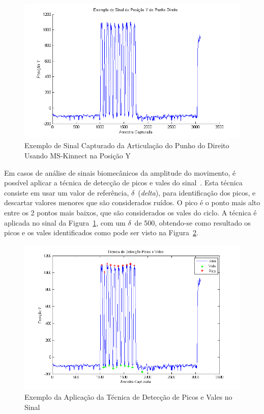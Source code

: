 \begin{figure}[!htb]
     \centering
     \includegraphics[width=1\textwidth]{./img/exsinalposicaoypunhodireito.png}
     \caption{Exemplo de Sinal Capturado da Articulação do Punho do Direito Usando MS-Kinnect na Posição Y}
     \label{img:exsinalposicaopunho}
\end{figure}

Em casos de análise de sinais biomecânicos da amplitude do movimento, é possível aplicar a técnica de detecção de picos e vales do sinal~\cite{peakdetect}. Esta técnica consiste em usar um valor de referência, $\delta$\ (\textit{delta}), para identificação dos picos, e descartar valores menores que são considerados ruídos. O pico é o ponto mais alto entre os 2 pontos mais baixos, que são considerados os vales do ciclo. A técnica é aplicada no sinal da Figura~\ref{img:exsinalposicaopunho}, com um $\delta$\ de 500, obtendo-se como resultado os picos e os vales identificados como pode ser visto na Figura~\ref{img:expicosvales}.

\begin{figure}[!htb]
     \centering
     \includegraphics[width=1\textwidth]{./img/deteccaopicosvales.png}
     \caption{Exemplo da Aplicação da Técnica de Detecção de Picos e Vales no Sinal}
     \label{img:expicosvales}
\end{figure}


